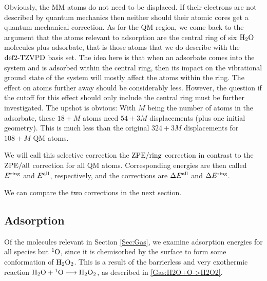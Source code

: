 \documentclass[8.5pt,twoside,twocolumn]{article}
\newcommand\zpe{\enmat{\te{ZPE}}}
\newcommand\ering{\enmat{E^{\te{ring}}}}
\newcommand\eall{\enmat{E^{\te{all}}}}
\newcommand\zpering{\enmat{\zpe/\te{ring}}}
\newcommand\zpeall{\enmat{\zpe/\te{all}}}
\newcommand\singo{\enmat{{^1\te{O}}}}
\theoremstyle{standard}
\begin{document}
Obviously, the MM atoms do not need to be displaced. If their electrons are not
described by quantum mechanics then neither should their atomic cores get a
quantum mechanical correction. As for the QM region, we come back to the argument that
the atoms relevant to adsorption are the central ring of six $\text H _2 \text O$ molecules plus adsorbate,
that is those atoms that we do describe with the $\text{def2-TZVPD}$ basis set. The idea
here is that when an adsorbate comes into the system and is adsorbed within the
central ring, then its impact on the vibrational ground state of the system
will mostly affect the atoms within the ring. The effect on atoms further
away should be considerably less. However, the question if the cutoff for this effect
should only include the central ring must be further investigated. The
upshot is obvious: With $M$ being the number of atoms in the adsorbate, these $18+M$ atoms
need $54+3M$ displacements (plus one initial geometry). This is much less than the
original $324+3M$ displacements for $108+M$ QM atoms.

We will call this selective correction the $\zpering$ correction in contrast to
the $\zpeall$ correction for all QM atoms. Corresponding energies are then called
$\ering$ and $\eall$, respectively, and the corrections are $\Dl\eall$ and $\Dl\ering$. 

We can compare the two corrections in the next section.



\subsection{Adsorption}
\label{Sec:Ads:Adsorption}
\newcommand\avg{\enmat{E_{\te {avg}}^{\te{ads}}}}
Of the molecules relevant in Section \ref{Sec:Gas}, we examine adsorption
energies for all species but $\singo$, since it is chemisorbed by the surface
to form some conformation of $\text H _2 \text O_2$. This is a result of the barrierless
and very exothermic reaction $\hto+\singo\chemar\htot$, as described in
\eqref{Gas:H2O+O->H2O2}.
\end{document}
